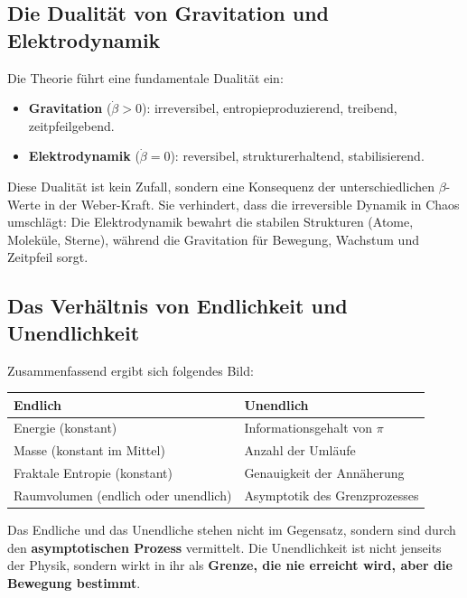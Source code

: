 \documentclass[12pt,a4paper]{article}
\begin{document}
\subsection{Die Dualität von Gravitation und Elektrodynamik}

Die Theorie führt eine fundamentale Dualität ein:

\begin{itemize}
    \item \textbf{Gravitation} ($\dot{\beta}>0$): irreversibel, entropieproduzierend, treibend, zeitpfeilgebend.
    \item \textbf{Elektrodynamik} ($\dot{\beta}=0$): reversibel, strukturerhaltend, stabilisierend.
\end{itemize}

Diese Dualität ist kein Zufall, sondern eine Konsequenz der unterschiedlichen $\beta$-Werte in der Weber-Kraft. Sie verhindert, dass die irreversible Dynamik in Chaos umschlägt: Die Elektrodynamik bewahrt die stabilen Strukturen (Atome, Moleküle, Sterne), während die Gravitation für Bewegung, Wachstum und Zeitpfeil sorgt.

\subsection{Das Verhältnis von Endlichkeit und Unendlichkeit}

Zusammenfassend ergibt sich folgendes Bild:

\begin{center}
\begin{tabular}{|l|l|}
\hline
\textbf{Endlich} & \textbf{Unendlich} \\ \hline
Energie (konstant) & Informationsgehalt von $\pi$ \\ \hline
Masse (konstant im Mittel) & Anzahl der Umläufe \\ \hline
Fraktale Entropie (konstant) & Genauigkeit der Annäherung \\ \hline
Raumvolumen (endlich oder unendlich) & Asymptotik des Grenzprozesses \\ \hline
\end{tabular}
\end{center}

Das Endliche und das Unendliche stehen nicht im Gegensatz, sondern sind durch den \textbf{asymptotischen Prozess} vermittelt. Die Unendlichkeit ist nicht jenseits der Physik, sondern wirkt in ihr als \textbf{Grenze, die nie erreicht wird, aber die Bewegung bestimmt}.
\end{document}
